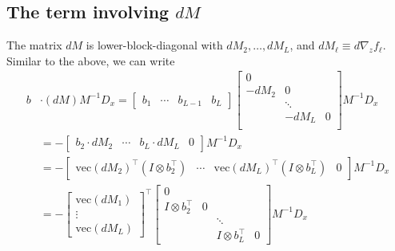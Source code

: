 \documentclass{article}
\begin{document}
\subsection{The term involving $dM$}

The matrix $dM$ is lower-block-diagonal with $dM_2,\ldots, dM_L$, and $dM_\ell \equiv d \nabla_z f_\ell$. Similar to
the above, we can write
\begin{align}
  b & \cdot (dM) M^{-1} D_x =
  \begin{bmatrix}
    b_1 & \cdots & b_{L-1} & b_L
  \end{bmatrix}
  \begin{bmatrix}
    0                  \\
    -dM_2 & 0          \\
    & \ddots     \\
    & -dM_L  & 0 \\
  \end{bmatrix}
  M^{-1} D_x                                                                   \\
  & = -
  \begin{bmatrix}
    b_2 \cdot dM_2 & \cdots & b_L \cdot dM_L & 0
  \end{bmatrix}
  M^{-1} D_x                                                                   \\
  & = -
  \begin{bmatrix}
    \mathrm{vec} \left(dM_2\right)^\top \left(I \otimes b_2^\top\right) &
    \cdots                                                              &
    \mathrm{vec} \left(dM_L\right)^\top \left(I \otimes b_L^\top\right) &
    0
  \end{bmatrix}
  M^{-1} D_x                                                                   \\
  & =
  -
  \begin{bmatrix}
    \mathrm{vec} \left(dM_1\right) \\
    \vdots                         \\
    \mathrm{vec} \left(dM_L\right)
  \end{bmatrix}
  ^\top
  \begin{bmatrix}
    0                                               \\
    I \otimes b_2^\top & 0                          \\
    &   & \ddots                 \\
    &   & I \otimes b_L^\top & 0
  \end{bmatrix}
  M^{-1} D_x                                                                   \\

\end{align}
\end{document}

